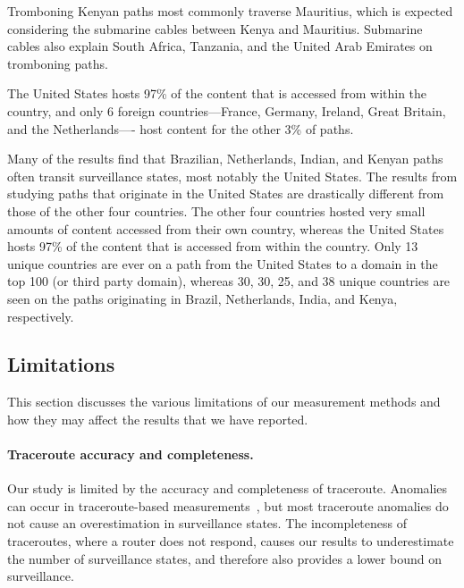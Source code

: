 Tromboning Kenyan paths most commonly traverse Mauritius, which is expected considering the submarine cables between Kenya and Mauritius.  Submarine cables also explain South Africa, Tanzania, and the United Arab Emirates on tromboning paths.  

\begin{finding}
The United States hosts 97\% of the content that is accessed from within the country, and only 6 foreign countries---France, Germany, Ireland, Great Britain, and the Netherlands---- host content for the other 3\% of paths.
\end{finding}
\noindent
Many of the results find that Brazilian,
Netherlands, Indian, and Kenyan paths often transit surveillance states,
most notably the United States.  The results from studying paths that
originate in the United States are drastically different from those of
the other four countries.  The other four countries hosted very small
amounts of content accessed from their own country, whereas the United
States hosts 97\% of the content that is accessed from within the
country.  Only 13 unique countries are ever on a path from the United
States to a domain in the top 100 (or third party domain), whereas 30,
30, 25, and 38 unique countries are seen on the paths originating in
Brazil, Netherlands, India, and Kenya, respectively.   


\subsection{Limitations}

This section discusses the various limitations of our measurement methods
and how they may affect the results that we have reported.

\paragraph{Traceroute accuracy and completeness.}
Our study is limited by the accuracy and completeness of traceroute.
Anomalies can occur in traceroute-based
measurements~\cite{augustin2006avoiding}, but most traceroute anomalies
do not cause an overestimation in surveillance states.  The
incompleteness of traceroutes, where a router does not respond, causes
our results to underestimate the number of surveillance states, and
therefore also provides a lower bound on surveillance. 

